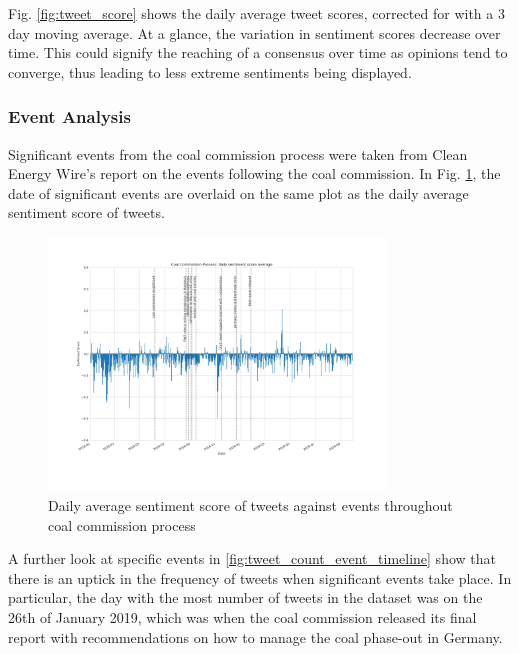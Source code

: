 \documentclass[10pt,twocolumn,twoside]{layout}
\begin{document}
Fig. \ref{fig:tweet_score} shows the daily average tweet scores, corrected for with a 3 day moving average. At a glance, the variation in sentiment scores decrease over time. This could signify the reaching of a consensus over time as opinions tend to converge, thus leading to less extreme sentiments being displayed. 

\subsubsection*{Event Analysis} 
Significant events from the coal commission process were taken from Clean Energy Wire's report on the events following the coal commission. \cite{Amelang2019} In Fig. \ref{fig:tweet_score_event_timeline}, the date of significant events are overlaid on the same plot as the daily average sentiment score of tweets. 
 
\begin{figure}[bp] 
	\begin{center}
		\includegraphics[width=0.8\textwidth]{figures/tweet_score_event_timeline}
	\end{center}
	\caption{Daily average sentiment score of tweets against events throughout coal commission process}
	\label{fig:tweet_score_event_timeline}
\end{figure}

A further look at specific events in \ref{fig:tweet_count_event_timeline} show that there is an uptick in the frequency of tweets when significant events take place. In particular, the day with the most number of tweets in the dataset was on the 26th of January 2019, which was when the coal commission released its final report with recommendations on how to manage the coal phase-out in Germany. 
\end{document}
